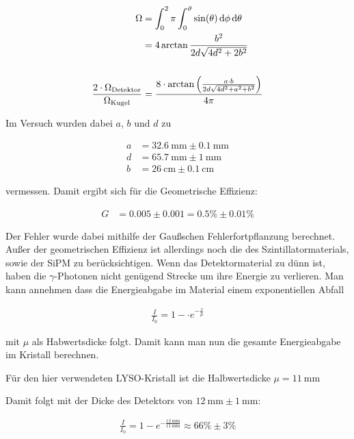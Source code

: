 \documentclass[12pt,twoside,a4paper]{scrartcl}
\begin{document}
			\begin{align*}
				\Omega &= \int_0^2 \pi \int_0^\vartheta \sin(\theta) \dd{\phi} \dd{\theta}\\
							 &= 4 \arctan{ \frac{b^2}{2d \sqrt{4d^2 + 2b^2}}} \\
				\\
				\frac{2 \cdot \Omega_{\text{Detektor}}}{\Omega_{\text{Kugel}}} &=  \frac{8 \cdot \arctan{\qty(\frac{a\cdot b}{2d\sqrt{4d^2 + a^2 + b^2}})}}{4 \pi}
			\end{align*}

			Im Versuch wurden dabei $a$, $b$ und $d$ zu

			\begin{align*}
					a &= \SI{32.6}{\milli \metre} \pm \SI{0.1}{\milli \metre} \\
					d &= \SI{65.7}{\milli \metre} \pm \SI{1}{\milli \metre}\\
					b &= \SI{26}{\centi \metre}\pm \SI{0.1}{\centi \metre}
			\end{align*}

			vermessen. Damit ergibt sich für die Geometrische Effizienz:

			\begin{align*}
				G &= 0.005 \pm 0.001 = 0.5 \% \pm 0.01 \%
			\end{align*}

			Der Fehler wurde dabei mithilfe der Gaußschen Fehlerfortpflanzung berechnet.
			Außer der geometrischen Effizienz ist allerdings noch die des Szintillatormaterials, sowie der SiPM zu berücksichtigen. Wenn das Detektormaterial zu dünn ist, haben die $\gamma$-Photonen nicht genügend Strecke um ihre Energie zu verlieren. Man kann annehmen dass die Energieabgabe im Material einem exponentiellen Abfall

			\begin{align*}
				\frac{I}{I_0} = 1 - \cdot e^{-\frac{x}{\mu}}
			\end{align*}

			mit $\mu$ als Habwertsdicke folgt. Damit kann man nun die gesamte Energieabgabe im Kristall berechnen.

			Für den hier verwendeten LYSO-Kristall ist die Halbwertsdicke $\mu = \SI{11}{\milli \metre}$

			Damit folgt mit der Dicke des Detektors von $\SI{12}{\milli \metre} \pm \SI{1}{\milli \metre}$:

			\begin{align*}
				\frac{I}{I_0} = 1 - e^{-\frac{\SI{12}{\milli \metre}}{\SI{11}{\milli \metre}}} \approx 66 \% \pm 3 \%
			\end{align*}
\end{document}
